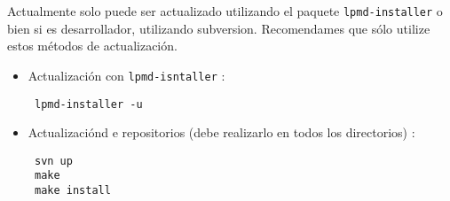  Actualmente {\lpmd} solo puede ser actualizado utilizando el paquete \verb|lpmd-installer| o bien si es desarrollador, utilizando subversion. Recomendames que s\'olo utilize estos m\'etodos de actualizaci\'on.

\begin{itemize}
 \item Actualizaci\'on con \verb|lpmd-isntaller| :
 \begin{verbatim}
 lpmd-installer -u
 \end{verbatim}
 \item Actualizaci\'ond e repositorios (debe realizarlo en todos los directorios) :
 \begin{verbatim}
 svn up
 make
 make install
 \end{verbatim}
\end{itemize}
